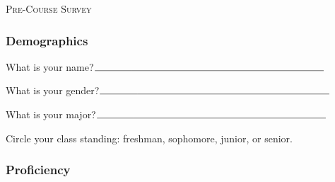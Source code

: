 \documentclass[11pt]{article}
\begin{document}
\begin{center}
\Large{\textsc{Pre-Course Survey }}\\
\end{center}

\vspace{.2cm}

\subsubsection*{Demographics}

\begin{enumerate}[{$\qquad 1.]$}]
\item What is your name?$\line(1,0){38}\line(1,0){195}$
\item What is your gender?$\line(1,0){38}\line(1,0){195}$
\item What is your major?$\line(1,0){38}\line(1,0){195}$
\item Circle your class standing: freshman, sophomore, junior, or senior. 
\end{enumerate}


\subsubsection*{Proficiency}
\end{document}

